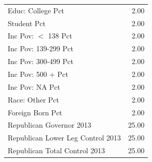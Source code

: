 \begin{table}[ht]
\begin{tabular}{lr}
  Educ: College Pct & 2.00 \\ 
  Student Pct & 2.00 \\ 
  Inc Pov: $<$ 138 Pct & 2.00 \\ 
  Inc Pov: 139-299 Pct & 2.00 \\ 
  Inc Pov: 300-499 Pct & 2.00 \\ 
  Inc Pov: 500 + Pct & 2.00 \\ 
  Inc Pov: NA Pct & 2.00 \\ 
  Race: Other Pct & 2.00 \\ 
  Foreign Born Pct & 2.00 \\ 
  Republican Governor 2013 & 25.00 \\ 
  Republican Lower Leg Control 2013 & 25.00 \\ 
  Republican Total Control 2013 & 25.00 \\ 
   \hline
\end{tabular}
\end{table}

\newpage

